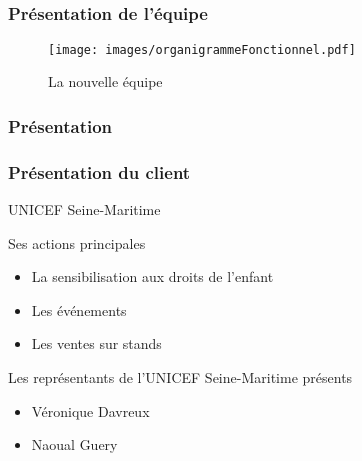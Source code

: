 \subsection{} %

\speaker{\Pierre}

\begin{frame}

\frametitle{Présentation de l'équipe}
	\begin{figure}[!h]
		\begin{center}
			\texttt{[image: images/organigrammeFonctionnel.pdf]}
			\caption{La nouvelle équipe}
		\end{center}
	\end{figure}

\end{frame}

\begin{frame}
\frametitle{Présentation}
	\frametitle{Présentation du client}
	\begin{center}
		UNICEF Seine-Maritime
	\end{center}

	\begin{block}{Ses actions principales}
		\begin{itemize}
			\item La sensibilisation aux droits de l'enfant
			\item Les événements 
			\item Les ventes sur stands
		\end{itemize}
	\end{block}

	\begin{block}{Les représentants de l'UNICEF Seine-Maritime présents}
		\begin{itemize}
			\item Véronique Davreux
			\item Naoual Guery
		\end{itemize}
	\end{block}
\end{frame}
